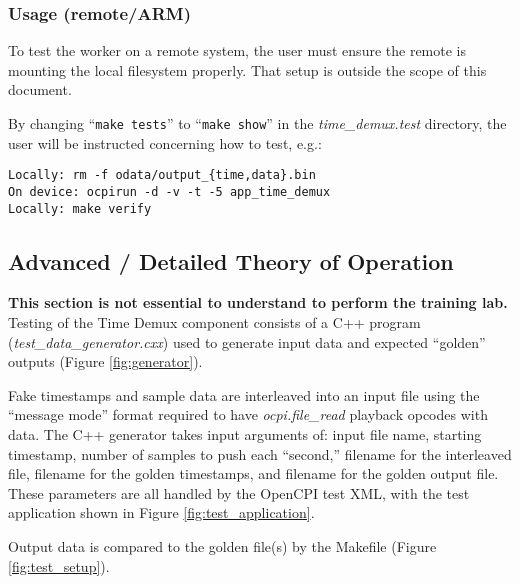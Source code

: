\documentclass{article}
\begin{document}
\subsubsection*{Usage (remote/ARM)}
To test the worker on a remote system, the user must ensure the remote is mounting the local filesystem properly. That setup is outside the scope of this document.\medskip

By changing ``\verb+make tests+'' to ``\verb+make show+'' in the \textit{time\_demux.test} directory, the user will be instructed concerning how to test, e.g.:
\begin{verbatim}
Locally: rm -f odata/output_{time,data}.bin
On device: ocpirun -d -v -t -5 app_time_demux
Locally: make verify
\end{verbatim}
\medskip
\fi
\subsection*{Advanced / Detailed Theory of Operation}
\textbf{This section is not essential to understand to perform the training lab.}\\

Testing of the Time Demux component consists of a C++ program (\textit{test\_data\_generator.cxx}) used to generate input data and expected ``golden'' outputs (Figure \ref{fig:generator}).\medskip

Fake timestamps and sample data are interleaved into an input file using the ``message mode'' format required to have \textit{ocpi.file\_read} playback opcodes with data. The C++ generator takes input arguments of: input file name, starting timestamp, number of samples to push each ``second,'' filename for the interleaved file, filename for the golden timestamps, and filename for the golden output file. These parameters are all handled by the OpenCPI test XML, with the test application shown in Figure \ref{fig:test_application}.\medskip
\iffalse
There is one OAS or Application XML (\textit{app\_time\_demux.xml}) that connects standard CDK-provided file reader and file writers to the UUT
\fi

Output data is compared to the golden file(s) by the Makefile (Figure \ref{fig:test_setup}).
\end{document}
